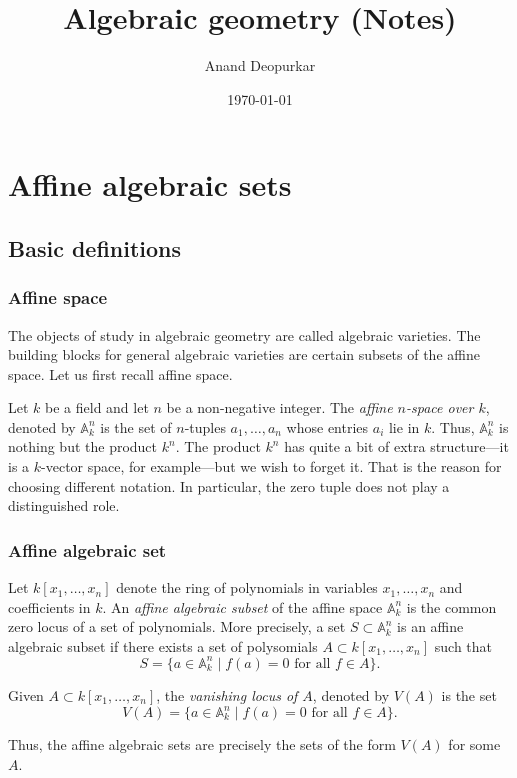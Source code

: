 \documentclass[11pt]{article}
\author{Anand Deopurkar}
\date{\today}
\title{Algebraic geometry (Notes)}
\begin{document}
\maketitle

\section{Affine algebraic sets}
\label{sec:org2dbac8f}
\subsection{Basic definitions}
\label{sec:org4dddde2}
\subsubsection{Affine space}
\label{sec:org46b6db6}
The objects of study in algebraic geometry are called algebraic varieties.
The building blocks for general algebraic varieties are certain subsets of the affine space.
Let us first recall affine space.

Let \(k\) be a field and let \(n\) be a non-negative integer.
The \emph{affine \(n\)-space over \(k\)}, denoted by \(\mathbb A^n_k\) is the set of \(n\)-tuples \(a_1,\dots, a_n\) whose entries \(a_i\) lie in \(k\).
Thus, \(\mathbb A^n_k\) is nothing but the product \(k^n\).
The product \(k^n\) has quite a bit of extra structure---it is a \(k\)-vector space, for example---but we wish to forget it.
That is the reason for choosing different notation.
In particular, the zero tuple does not play a distinguished role.

\subsubsection{Affine algebraic set}
\label{sec:orgb74ddcb}
Let \(k[x_1,\dots,x_n]\) denote the ring of polynomials in variables \(x_1, \dots, x_n\) and coefficients in \(k\).
An \emph{affine algebraic subset} of the affine space \(\mathbb A^n_k\) is the common zero locus of a set of polynomials.
More precisely, a set \(S \subset \mathbb A^n_k\) is an affine algebraic subset if there exists a set of polysomials \(A \subset k[x_1,\dots,x_n]\) such that
\[ S = \{a \in \mathbb A^n_k \mid f(a) = 0 \text{ for all } f \in A\}.\]
\begin{definition}
Given \(A \subset k[x_1,\dots,x_n]\), the \emph{vanishing locus of \(A\)}, denoted by \(V(A)\) is the set 
\[ V(A) = \{a \in \mathbb A^n_k \mid f(a) = 0 \text{ for all } f \in A\}.\]
\end{definition}
Thus, the affine algebraic sets are precisely the sets of the form \(V(A)\) for some \(A\).
\end{document}
